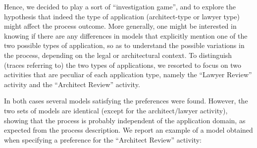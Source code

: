 Hence, we decided to play a sort of ``investigation game'', and to explore the hypothesis that indeed the type of application (architect-type or lawyer type) might affect the process outcome. More generally, one might be interested in knowing if there are any differences in models that explicitly mention one of the two possible types of application, so as to understand the possible variations in the process, depending on the legal or architectural context. To distinguish (traces referring to) the two types of applications, we resorted to focus on two activities that are peculiar of each application type, namely the “Lawyer Review” activity and the “Architect Review” activity.

In both cases several models satisfying the preferences were found. However, the two sets of models are identical (except for the architect/lawyer activity), showing that the process is probably independent of the application domain, as expected from the process description.
We report an example of a model obtained when specifying a preference for the “Architect Review” activity:


